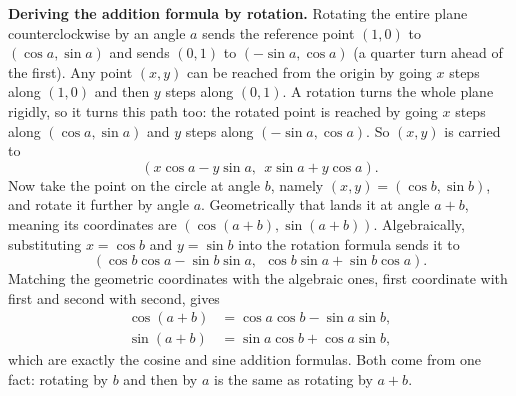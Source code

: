 \begin{focusbox}
\textbf{Deriving the addition formula by rotation.} Rotating the entire plane counterclockwise by an angle $a$ sends the reference point $(1,0)$ to $(\cos a, \sin a)$ and sends $(0,1)$ to $(-\sin a, \cos a)$ (a quarter turn ahead of the first). Any point $(x,y)$ can be reached from the origin by going $x$ steps along $(1,0)$ and then $y$ steps along $(0,1)$. A rotation turns the whole plane rigidly, so it turns this path too: the rotated point is reached by going $x$ steps along $(\cos a,\sin a)$ and $y$ steps along $(-\sin a,\cos a)$. So $(x,y)$ is carried to
\[
  (x\cos a - y\sin a,\ \ x\sin a + y\cos a).
\]
Now take the point on the circle at angle $b$, namely $(x,y) = (\cos b, \sin b)$, and rotate it further by angle $a$. Geometrically that lands it at angle $a+b$, meaning its coordinates are $(\cos(a+b), \sin(a+b))$. Algebraically, substituting $x = \cos b$ and $y = \sin b$ into the rotation formula sends it to
\[
  (\cos b\cos a - \sin b\sin a,\ \ \cos b \sin a + \sin b\cos a).
\]
Matching the geometric coordinates with the algebraic ones, first coordinate with first and second with second, gives
\begin{align*}
  \cos(a+b) &= \cos a\cos b - \sin a\sin b,\\
  \sin(a+b) &= \sin a\cos b + \cos a\sin b,
\end{align*}
which are exactly the cosine and sine addition formulas. Both come from one fact: rotating by $b$ and then by $a$ is the same as rotating by $a+b$.
\end{focusbox}

